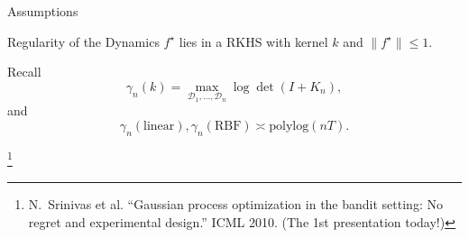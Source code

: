 \documentclass[11pt,aspectratio=169]{beamer}
\newcommand\reffootnote[1]{%
\begingroup
\renewcommand\thefootnote{}\footnote{\hspace{-20px}\color{DarkGray}#1\vspace{5px}}%
\addtocounter{footnote}{-1}%
\endgroup
}
\begin{document}


\begin{frame}{Assumptions}

            

    \begin{block}{Regularity of the Dynamics}
        $f^\star$ lies in a RKHS with kernel $k$ and $\lVert f^\star \rVert \leq 1$.
    \end{block}

    Recall
    \[
        \gamma_n(k) = \max_{\mathcal{D}_1,\ldots,\mathcal{D}_n} \log\det(I + K_n),
    \]
    and
    \[
        \gamma_n(\text{linear}), \gamma_n(\text{RBF}) \asymp \text{polylog}(nT).
    \]

    
    \reffootnote{N.~Srinivas et al. ``Gaussian process optimization in the bandit setting: No regret and experimental design.'' ICML 2010. (The 1st presentation today!)}
\end{frame}
\end{document}
